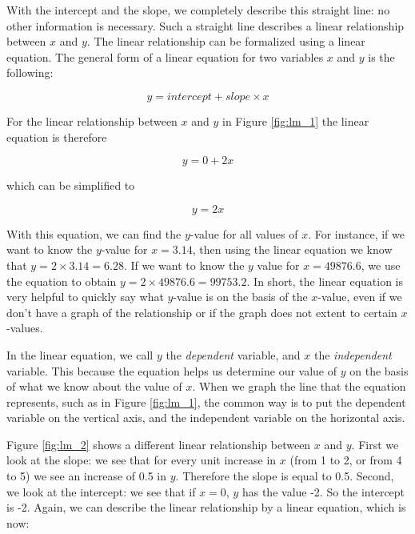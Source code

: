 \documentclass[]{report}\usepackage[]{graphicx}\usepackage[]{color}
\begin{document}
With the intercept and the slope, we completely describe this straight line: no other information is necessary. Such a straight line describes a linear relationship between $x$ and $y$. The linear relationship can be formalized using a linear equation. The general form of a linear equation for two variables $x$ and $y$ is the following:

\begin{equation}
y = intercept + slope \times x
\end{equation}


For the linear relationship between $x$ and $y$ in Figure \ref{fig:lm_1} the linear equation is therefore

\begin{equation}
y = 0 + 2 x
\end{equation}

which can be simplified to

\begin{equation}
y =  2 x
\end{equation}


With this equation, we can find the $y$-value for all values of $x$. For instance, if we want to know the $y$-value for $x=3.14$, then using the linear equation we know that $y = 2 \times 3.14 = 6.28$. If we want to know the $y$ value for $x=49876.6$, we use the equation to obtain $y=2\times 49876.6 = 99753.2$. In short, the linear equation is very helpful to quickly say what $y$-value is on the basis of the $x$-value, even if we don't have a graph of the relationship or if the graph does not extent to certain $x$-values.


In the linear equation, we call $y$ the \textit{dependent} variable, and $x$ the \textit{independent} variable. This because the equation helps us determine our value of $y$ on the basis of what we know about the value of $x$. When we graph the line that the equation represents, such as in Figure \ref{fig:lm_1}, the common way is to put the dependent variable on the vertical axis, and the independent variable on the horizontal axis. 


Figure \ref{fig:lm_2} shows a different linear relationship between $x$ and $y$. First we look at the slope: we see that for every unit increase in $x$ (from 1 to 2, or from 4 to 5) we see an increase of 0.5 in $y$. Therefore the slope is equal to 0.5. Second, we look at the intercept: we see that if $x=0$, $y$ has the value -2. So the intercept is -2. Again, we can describe the linear relationship by a linear equation, which is now:
\end{document}
